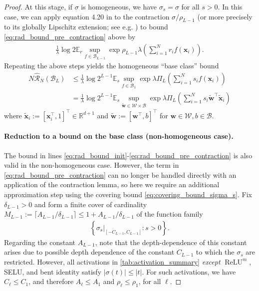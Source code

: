 \documentclass{article}
\DeclareMathOperator{\ReLU}{\mathrm{ReLU}}
\def\vw{{\bm{w}}}
\def\vx{{\bm{x}}}
\def\cB{{\mathcal{B}}}
\def\cR{{\mathcal{R}}}
\def\cW{{\mathcal{W}}}
\def\bE{{\mathbb{E}}}
\newcommand{\R}{\mathbb{R}}
\begin{document}
\begin{appendices}
\begin{proof}
    At this stage, if $\sigma$ is homogeneous, we have $\sigma_s = \sigma$ for all $s > 0$. In this case, we can apply equation 4.20 in \cite{ledoux1991probability} to the contraction $\sigma/\rho_{L-1}$ (or  more precisely to its globally Lipschitz extension; see e.g. \cite{mcshane1934extension}) to bound \eqref{eq:rad_bound_pre_contraction} above by
    \begin{align} \label{eq:rad_bound_post_contraction_homogeneous}
        \frac{1}{\lambda} \log 2 \bE_r \sup_{f \in \cB_{L-1}} \exp \rho_{L-1} \lambda \left( \sum_{i=1}^N r_i f(\vx_i)  \right).
    \end{align}
    Repeating the above steps yields the homogeneous ``base class'' bound
    \begin{align} \label{eq:base_rad_bound_homogeneous}
        N \widehat{\cR}_N(\cB_L) &\leq \frac{1}{\lambda} \log 2^{L-1} \bE_s \sup_{f \in \cB_1} \exp \lambda \Pi_L \left( \sum_{i=1}^N s_i f(\vx_i) \right)  \\
        &= \frac{1}{\lambda} \log 2^{L-1} \bE_s \sup_{\widetilde{\vw} \in \cW \times \cB} \exp \lambda \Pi_L \left( \sum_{i=1}^N s_i \widetilde{\vw}^\top \widetilde{\vx}_i \right) \label{eq:rad_base_class_bound_homogeneous}
    \end{align}
    where $\widetilde{\vx}_i := [\vx_i^\top, 1]^\top \in \R^{d+1}$ and $\widetilde{\vw} := [\vw^\top, b]^\top$ for $\vw \in \cW, b \in \cB$.
    
    \paragraph{Reduction to a bound on the base class (non-homogeneous case).} The bound in lines \eqref{eq:rad_bound_init}-\eqref{eq:rad_bound_pre_contraction} is also valid in the non-homogeneous case. However, the term in \eqref{eq:rad_bound_pre_contraction} can no longer be handled directly with an application of the contraction lemma, so here we require an additional approximation step using the covering bound \eqref{eq:covering_bound_sigma_s}. Fix $\delta_{L-1} > 0$ and form a finite cover of cardinality $M_{L-1} := \lceil A_{L-1}/\delta_{L-1}\rceil \leq 1 + A_{L-1}/\delta_{L-1}$ of the function family
    \begin{align}
        \left\{ \sigma_s \big \rvert_{[-C_{L-1}, C_{L-1}]} : s > 0 \right\}.
    \end{align}
    Regarding the constant $A_{L-1}$, note that the depth-dependence of this constant arises due to possible depth dependence of the constant $C_{L-1}$ to which the $\sigma_s$ are restricted. However, all activations in \cref{tab:activation_summary} \textit{except} $\ReLU^m$, SELU, and bent identity satisfy $|\sigma(t)| \leq |t|$. For such activations, we have $C_\ell \leq C_1$, and therefore $A_\ell \leq A_1$ and $\rho_\ell \leq \rho_1$, for all $\ell$.
    

\end{proof}
\end{appendices}
\end{document}
